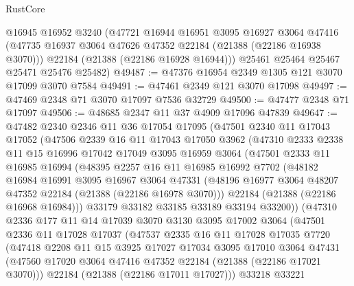 \begin{lexlean}{RustCore}
\begin{coremodule}
      @16945
      @16952
      @3240
      (@47721
        @16944
        @16951
        @3095
        @16927
        @3064
        @47416
        (@47735 @16937 @3064 @47626 @47352 @22184 (@21388 (@22186 @16938 @3070)))
        @22184
        (@21388 (@22186 @16928 @16944)))
      @25461
      @25464
      @25467
      @25471
      @25476
      @25482)
@49487 := @47376 @16954 @2349 @1305 @121 @3070 @17099 @3070 @7584
@49491 := @47461 @2349 @121 @3070 @17098
@49497 := @47469 @2348 @71 @3070 @17097 @7536 @32729
@49500 := @47477 @2348 @71 @17097
@49506 := @48685 @2347 @11 @37 @4909 @17096 @47839
@49647 := @47482
    @2340
    @2346
    @11
    @36
    @17054
    @17095
    (@47501
      @2340
      @11
      @17043
      @17052
      (@47506
        @2339
        @16
        @11
        @17043
        @17050
        @3962
        (@47310
          @2333
          @2338
          @11
          @15
          @16996
          @17042
          @17049
          @3095
          @16959
          @3064
          (@47501
            @2333
            @11
            @16985
            @16994
            (@48395
              @2257
              @16
              @11
              @16985
              @16992
              @7702
              (@48182
                @16984
                @16991
                @3095
                @16967
                @3064
                @47331
                (@48196 @16977 @3064 @48207 @47352 @22184 (@21388 (@22186 @16978 @3070)))
                @22184
                (@21388 (@22186 @16968 @16984)))
              @33179
              @33182
              @33185
              @33189
              @33194
              @33200))
          (@47310
            @2336
            @177
            @11
            @14
            @17039
            @3070
            @3130
            @3095
            @17002
            @3064
            (@47501
              @2336
              @11
              @17028
              @17037
              (@47537
                @2335
                @16
                @11
                @17028
                @17035
                @7720
                (@47418
                  @2208
                  @11
                  @15
                  @3925
                  @17027
                  @17034
                  @3095
                  @17010
                  @3064
                  @47431
                  (@47560 @17020 @3064 @47416 @47352 @22184 (@21388 (@22186 @17021 @3070)))
                  @22184
                  (@21388 (@22186 @17011 @17027)))
                @33218
                @33221

\end{coremodule}
\end{lexlean}
